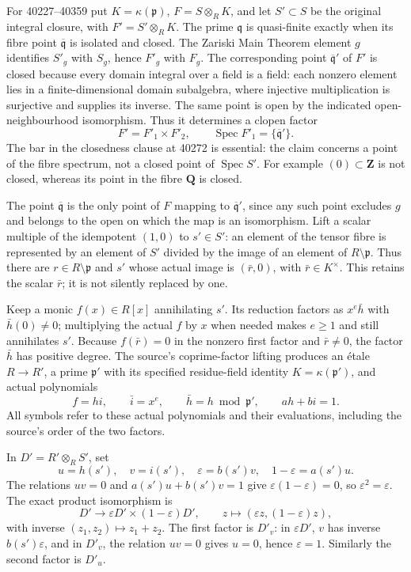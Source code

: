 For 40227--40359 put \(K=\kappa(\mathfrak p)\), \(F=S\otimes_R K\), and let \(S'\subset S\) be the original integral closure, with \(F'=S'\otimes_R K\). The prime \(\mathfrak q\) is quasi-finite exactly when its fibre point \(\overline{\mathfrak q}\) is isolated and closed. The Zariski Main Theorem element \(g\) identifies \(S'_g\) with \(S_g\), hence \(F'_g\) with \(F_g\). The corresponding point \(\overline{\mathfrak q}'\) of \(F'\) is closed because every domain integral over a field is a field: each nonzero element lies in a finite-dimensional domain subalgebra, where injective multiplication is surjective and supplies its inverse. The same point is open by the indicated open-neighbourhood isomorphism. Thus it determines a clopen factor \[
F'=F'_1\times F'_2,\qquad
\operatorname{Spec}F'_1=\{\overline{\mathfrak q}'\}.
\] The bar in the closedness clause at 40272 is essential: the claim concerns a point of the fibre spectrum, not a closed point of \(\operatorname{Spec}S'\). For example \((0)\subset\mathbf Z\) is not closed, whereas its point in the fibre \(\mathbf Q\) is closed.

The point \(\overline{\mathfrak q}\) is the only point of \(F\) mapping to \(\overline{\mathfrak q}'\), since any such point excludes \(g\) and belongs to the open on which the map is an isomorphism. Lift a scalar multiple of the idempotent \((1,0)\) to \(s'\in S'\): an element of the tensor fibre is represented by an element of \(S'\) divided by the image of an element of \(R\setminus\mathfrak p\). Thus there are \(r\in R\setminus\mathfrak p\) and \(s'\) whose actual image is \((\bar r,0)\), with \(\bar r\in K^\times\). This retains the scalar \(\bar r\); it is not silently replaced by one.

Keep a monic \(f(x)\in R[x]\) annihilating \(s'\). Its reduction factors as \(x^e\bar h\) with \(\bar h(0)\ne0\); multiplying the actual \(f\) by \(x\) when needed makes \(e\ge1\) and still annihilates \(s'\). Because \(f(\bar r)=0\) in the nonzero first factor and \(\bar r\ne0\), the factor \(\bar h\) has positive degree. The source's coprime-factor lifting produces an étale \(R\to R'\), a prime \(\mathfrak p'\) with its specified residue-field identity \(K=\kappa(\mathfrak p')\), and actual polynomials \[
f=hi,\qquad \bar i=x^e,\qquad \bar h=h\bmod\mathfrak p',
\qquad ah+bi=1.
\] All symbols refer to these actual polynomials and their evaluations, including the source's order of the two factors.

In \(D'=R'\otimes_R S'\), set \[
u=h(s'),\quad v=i(s'),\quad
\varepsilon=b(s')v,\quad 1-\varepsilon=a(s')u.
\] The relations \(uv=0\) and \(a(s')u+b(s')v=1\) give \(\varepsilon(1-\varepsilon)=0\), so \(\varepsilon^2=\varepsilon\). The exact product isomorphism is \[
D'\longrightarrow \varepsilon D'\times(1-\varepsilon)D',
\qquad z\longmapsto(\varepsilon z,(1-\varepsilon)z),
\] with inverse \((z_1,z_2)\mapsto z_1+z_2\). The first factor is \(D'_v\): in \(\varepsilon D'\), \(v\) has inverse \(b(s')\varepsilon\), and in \(D'_v\), the relation \(uv=0\) gives \(u=0\), hence \(\varepsilon=1\). Similarly the second factor is \(D'_u\).

